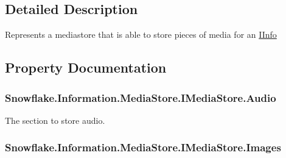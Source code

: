 \subsection{Detailed Description}
Represents a mediastore that is able to store pieces of media for an \hyperlink{interface_snowflake_1_1_information_1_1_i_info}{I\+Info} 



\subsection{Property Documentation}
\hypertarget{interface_snowflake_1_1_information_1_1_media_store_1_1_i_media_store_a283752cbb2839696fe291e4976b435ed}{}
\subsubsection[{Audio}]{ Snowflake.\+Information.\+Media\+Store.\+I\+Media\+Store.\+Audio\hspace{0.3cm}{\ttfamily [get]}}\label{interface_snowflake_1_1_information_1_1_media_store_1_1_i_media_store_a283752cbb2839696fe291e4976b435ed}


The section to store audio. 

\hypertarget{interface_snowflake_1_1_information_1_1_media_store_1_1_i_media_store_a3925774cc1ddc8c2171398ca21638569}{}
\subsubsection[{Images}]{ Snowflake.\+Information.\+Media\+Store.\+I\+Media\+Store.\+Images\hspace{0.3cm}{\ttfamily [get]}}\label{interface_snowflake_1_1_information_1_1_media_store_1_1_i_media_store_a3925774cc1ddc8c2171398ca21638569}


